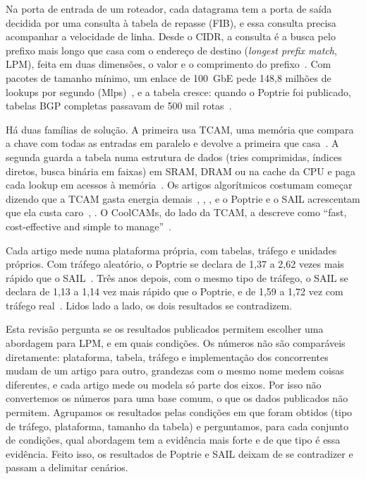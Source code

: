 \documentclass[conference,a4paper]{IEEEtran}
\begin{document}
Na porta de entrada de um roteador, cada datagrama tem a porta de saída decidida por uma consulta à tabela de repasse
(FIB), e essa consulta precisa acompanhar a velocidade de linha. Desde o CIDR, a consulta é a busca pelo prefixo mais
longo que casa com o endereço de destino (\textit{longest prefix match}, LPM), feita em duas dimensões, o valor e o
comprimento do prefixo~\cite[p.~10]{ruiz01}. Com pacotes de tamanho mínimo, um enlace de 100~GbE pede 148,8 milhões
de lookups por segundo (Mlps)~\cite[\S1]{asai15}, e a tabela cresce: quando o Poptrie foi publicado, tabelas BGP
completas passavam de 500 mil rotas~\cite[\S1]{asai15}.

Há duas famílias de solução. A primeira usa TCAM, uma memória que compara a chave com todas as entradas em paralelo
e devolve a primeira que casa~\cite[p.~38]{shah01}. A segunda guarda a tabela numa estrutura de dados (tries
comprimidas, índices diretos, busca binária em faixas) em SRAM, DRAM ou na cache da CPU e paga cada lookup em acessos
à memória~\cite[pp.~13--14]{ruiz01}. Os artigos algorítmicos costumam começar dizendo que a TCAM gasta energia
demais~\cite[\S1]{zec12}, \cite[\S1]{asai15}, \cite[\S II]{yang18}, e o Poptrie e o SAIL acrescentam que ela custa
caro~\cite[\S2]{asai15}, \cite[\S II]{yang18}. O CoolCAMs, do lado da TCAM, a descreve como
``fast, cost-effective and simple to manage''~\cite[Resumo]{zane03}.

Cada artigo mede numa plataforma própria, com tabelas, tráfego e unidades próprios. Com tráfego aleatório, o Poptrie
se declara de 1,37 a 2,62 vezes mais rápido que o SAIL~\cite[\S4.5]{asai15}. Três anos depois, com o mesmo tipo de
tráfego, o SAIL se declara de 1,13 a 1,14 vez mais rápido que o Poptrie, e de 1,59 a 1,72 vez com tráfego
real~\cite[\S VI-C]{yang18}. Lidos lado a lado, os dois resultados se contradizem.

Esta revisão pergunta se os resultados publicados permitem escolher uma abordagem para LPM, e em quais condições. Os
números não são comparáveis diretamente: plataforma, tabela, tráfego e implementação dos concorrentes mudam de um
artigo para outro, grandezas com o mesmo nome medem coisas diferentes, e cada artigo mede ou modela só parte dos eixos.
Por isso não convertemos os números para uma base comum, o que os dados publicados não permitem. Agrupamos os
resultados pelas condições em que foram obtidos (tipo de tráfego, plataforma, tamanho da tabela) e perguntamos, para
cada conjunto de condições, qual abordagem tem a evidência mais forte e de que tipo é essa evidência. Feito isso, os
resultados de Poptrie e SAIL deixam de se contradizer e passam a delimitar cenários.
\end{document}
